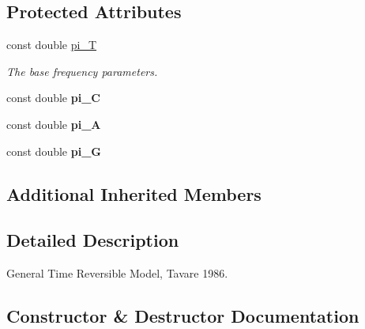 \subsection*{Protected Attributes}
\textbf{ }\par
\begin{DoxyCompactItemize}
\item 
const double \hyperlink{classretrocombinator_1_1GTRModel_ab002dbc62f8e8fbfc94558dd94166bd8}{pi\+\_\+T}
\begin{DoxyCompactList}\small\item\em The base frequency parameters. \end{DoxyCompactList}\item 
\mbox{\label{classretrocombinator_1_1GTRModel_a96e022540f373635aa6e381943a6c784}} 
const double {\bfseries pi\+\_\+C}
\item 
\mbox{\label{classretrocombinator_1_1GTRModel_a5d01f90292efd30b32d3196450fefd51}} 
const double {\bfseries pi\+\_\+A}
\item 
\mbox{\label{classretrocombinator_1_1GTRModel_a799b9eae55da958f079e0747f0a1602d}} 
const double {\bfseries pi\+\_\+G}
\end{DoxyCompactItemize}

\subsection*{Additional Inherited Members}


\subsection{Detailed Description}
General Time Reversible Model, Tavare 1986. 

\subsection{Constructor \& Destructor Documentation}
\mbox{\label{classretrocombinator_1_1GTRModel_addd67a44caae9a477fc986d287dc2e8e}} 
